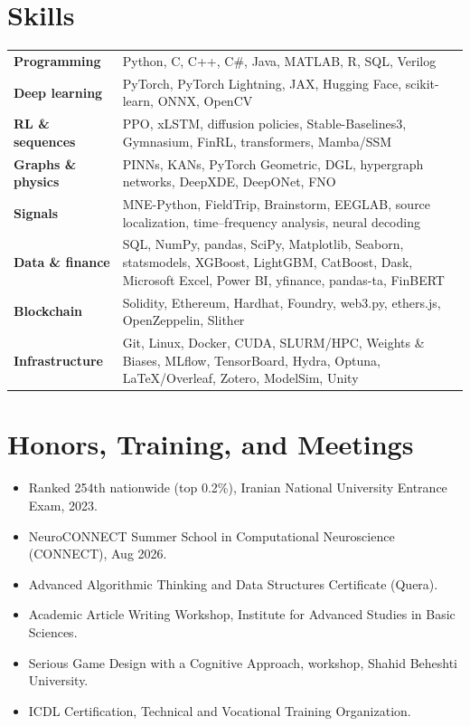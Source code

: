 \documentclass[11pt,a4paper]{article}
\newcommand{\subheader}[1]{%
  \vspace{0.35em}{\bfseries\normalsize #1}\par\vspace{0.2em}%
}
\begin{document}
\section*{Skills}

{\setlength{\tabcolsep}{0.55em}%
\begin{tabularx}{\textwidth}{@{}>{\bfseries}l X @{}}
Programming & {\small Python, C, C++, C\#, Java, MATLAB, R, SQL, Verilog}\\[0.28em]
Deep learning & {\small PyTorch, PyTorch Lightning, JAX, Hugging Face, scikit-learn, ONNX, OpenCV}\\[0.28em]
RL \& sequences & {\small PPO, xLSTM, diffusion policies, Stable-Baselines3, Gymnasium, FinRL, transformers, Mamba/SSM}\\[0.28em]
Graphs \& physics & {\small PINNs, KANs, PyTorch Geometric, DGL, hypergraph networks, DeepXDE, DeepONet, FNO}\\[0.28em]
Signals & {\small MNE-Python, FieldTrip, Brainstorm, EEGLAB, source localization, time--frequency analysis, neural decoding}\\[0.28em]
Data \& finance & {\small SQL, NumPy, pandas, SciPy, Matplotlib, Seaborn, statsmodels, XGBoost, LightGBM, CatBoost, Dask, Microsoft Excel, Power BI, yfinance, pandas-ta, FinBERT}\\[0.28em]
Blockchain & {\small Solidity, Ethereum, Hardhat, Foundry, web3.py, ethers.js, OpenZeppelin, Slither}\\[0.28em]
Infrastructure & {\small Git, Linux, Docker, CUDA, SLURM/HPC, Weights \& Biases, MLflow, TensorBoard, Hydra, Optuna, \LaTeX/Overleaf, Zotero, ModelSim, Unity}\\
\end{tabularx}}

\section*{Honors, Training, and Meetings}

\subheader{Distinctions \& training}
\begin{itemize}
  \item Ranked 254th nationwide (top 0.2\%), Iranian National University Entrance Exam, 2023.
  \item NeuroCONNECT Summer School in Computational Neuroscience (CONNECT), Aug 2026.
  \item Advanced Algorithmic Thinking and Data Structures Certificate (Quera).
  \item Academic Article Writing Workshop, Institute for Advanced Studies in Basic Sciences.
  \item Serious Game Design with a Cognitive Approach, workshop, Shahid Beheshti University.
  \item ICDL Certification, Technical and Vocational Training Organization.
\end{itemize}
\end{document}
